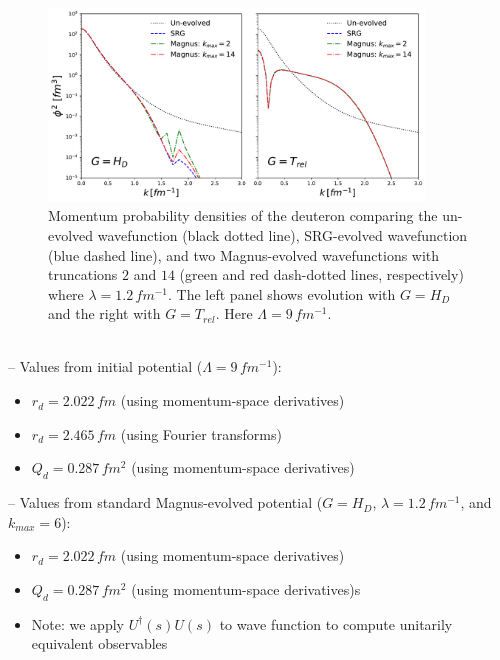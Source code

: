 \documentclass[preprintnumbers,floatfix,aps,prc,preprint,nofootinbib]{revtex4-1}
\begin{document}
\noindent{%
	\textcolor{red}{%
	UPDATED UP TO HERE 04/03/19
	}
}
\\
\begin{figure}
  	\captionsetup{singlelinecheck=false,justification=raggedright}
  	\centering
  	\includegraphics[width=10cm]{momentum_dist_Wendt_Lamb9}
  	\hspace*{0.05\textwidth}
  	\caption{Momentum probability densities of the deuteron comparing the un-evolved wavefunction (black dotted line), SRG-evolved wavefunction (blue dashed line), and two Magnus-evolved wavefunctions with truncations $2$ and $14$ (green and red dash-dotted lines, respectively) where $\lambda=1.2 \, fm^{-1}$. The left panel shows evolution with $G=H_{D}$ and the right with $G=T_{rel}$. Here $\Lambda=9 \, fm^{-1}$.}
  	\label{fig:momentum_dist_Wendt_Lamb9}
\end{figure}
%
\\
-- Values from initial potential ($\Lambda=9 \, fm^{-1}$):
\begin{itemize}
  	\item $r_d = 2.022 \, fm$ (using momentum-space derivatives)
  	\item $r_d = 2.465 \, fm$ (using Fourier transforms)
	\item $Q_d = 0.287 \, fm^2$ (using momentum-space derivatives)
\end{itemize}
-- Values from standard Magnus-evolved potential ($G=H_D$, $\lambda=1.2 \, fm^{-1}$, and $k_{max}=6$):
\begin{itemize}
  	\item $r_d = 2.022 \, fm$ (using momentum-space derivatives)
  	\item $Q_d = 0.287 \, fm^2$ (using momentum-space derivatives)s
  	\item Note: we apply $U^{\dagger}(s) U(s)$ to wave function to compute unitarily equivalent observables
\end{itemize}
\end{document}
